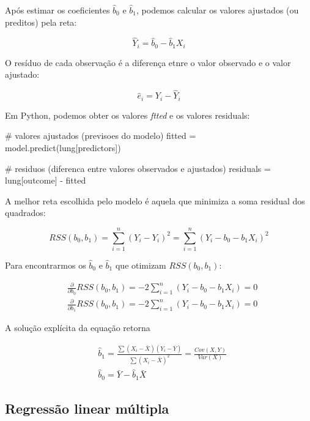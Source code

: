 \documentclass{article}
\begin{document}
Após estimar os coeficientes $\hat{b}_0$ e $\hat{b}_1$, podemos calcular os 
valores ajustados (ou preditos) pela reta:

\begin{equation}
    \hat{Y}_i = \hat{b}_0 - \hat{b}_1X_i
\end{equation}

O resíduo de cada observação é a diferença etnre o valor observado e o valor ajustado:

\begin{equation}
    \hat{e}_i = Y_i - \hat{Y}_i
\end{equation}

Em Python, podemos obter os valores \textit{ftted} e os valores residuals:

\begin{pythoncode}
# valores ajustados (previsoes do modelo)
fitted = model.predict(lung[predictors])

# residuos (diferenca entre valores observados e ajustados)
residuals = lung[outcome] - fitted
\end{pythoncode}

A melhor reta escolhida pelo modelo é aquela que minimiza a soma residual dos quadrados:

\begin{equation}
    RSS(b_0, b_1) = \sum_{i = 1}^{n}(Y_i - Y_i)^2 = \sum_{i = 1}^{n}(Y_i - b_0 - b_1X_i)^2
\end{equation}

Para encontrarmos os $\hat{b}_0$ e $\hat{b}_1$ que otimizam $RSS(b_0, b_1)$:

\begin{align*}
    &\frac{\partial}{\partial b_0}RSS(b_0, b_1) = -2\sum_{i = 1}^{n}(Y_i - b_0 - b_1X_i) = 0 \\
    &\frac{\partial}{\partial b_1}RSS(b_0, b_1) = -2\sum_{i = 1}^{n}(Y_i - b_0 - b_1X_i) = 0
\end{align*}

A solução explícita da equação retorna

\begin{align*}
    &\hat{b}_1 = \frac{\sum(X_i - \bar{X})(Y_i - \bar{Y})}{\sum(X_i - \bar{X})^2} = \frac{Cov(X, Y)}{Var(X)} \\
    &\hat{b}_0 = \bar{Y} - \hat{b}_1\bar{X}
\end{align*}

\subsection{Regressão linear múltipla}
\end{document}
